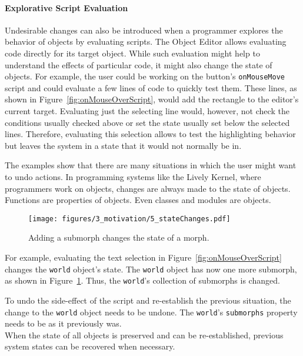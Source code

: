 \paragraph{Explorative Script Evaluation}
Undesirable changes can also be introduced when a programmer explores the behavior of objects by evaluating scripts.
The Object Editor allows evaluating code directly for its target object.
While such evaluation might help to understand the effects of particular code, it might also change the state of objects.
For example, the user could be working on the button's \lstinline{onMouseMove} script and could evaluate a few lines of code to quickly test them.
These lines, as shown in Figure~\ref{fig:onMouseOverScript}, would add the rectangle to the editor's current target.
Evaluating just the selecting line would, however, not check the conditions usually checked above or set the state usually set below the selected lines.
Therefore, evaluating this selection allows to test the highlighting behavior but leaves the system in a state that it would not normally be in.

The examples show that there are many situations in which the user might want to undo actions.
In programming systems like the Lively Kernel, where programmers work on objects, changes are always made to the state of objects.
Functions are properties of objects.
Even classes and modules are objects.

\begin{figure}[h]
    \centering
    \texttt{[image: figures/3\_motivation/5\_stateChanges.pdf]}
    \caption{Adding a submorph changes the state of a morph.}
    \label{fig:changedCharacter}
\end{figure}

For example, evaluating the text selection in Figure~\ref{fig:onMouseOverScript} changes the \lstinline{world} object's state.
The \lstinline{world} object has now one more submorph, as shown in Figure~\ref{fig:changedCharacter}.
Thus, the \lstinline{world}'s collection of submorphs is changed.

To undo the side-effect of the script and re-establish the previous situation, the change to the \lstinline{world} object needs to be undone.
The \lstinline{world}'s \lstinline{submorphs} property needs to be as it previously was.\\
When the state of all objects is preserved and can be re-established, previous system states can be recovered when necessary.

